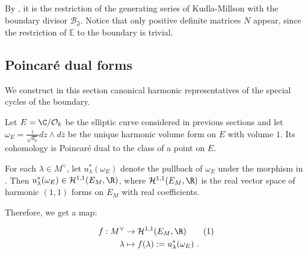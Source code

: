 \documentclass[11pt,letterpaper,english]{amsart}
\numberwithin{equation}{subsection}
\numberwithin{equation}{section}
\newcommand\numberthis{\addtocounter{equation}{1}\tag{\theequation}}
\newcommand\cB{{\mathcal B}}
\newcommand\cO{{\mathcal O}}
\newcommand\fJ{{\mathfrak J}}
\theoremstyle{plain}
\theoremstyle{remark}
\begin{document}
By , it is the restriction of the generating series of Kudla-Millson with the boundary divisor $\cB_\fJ$. Notice that only positive definite matrices $N$ appear, since the restriction of $\mathbb E$ to the boundary is trivial.



       

\subsection{Poincar\'e dual forms}

We construct in this section canonical harmonic representatives of the special cycles of the boundary. 

\medskip 

 Let $E=\C/\cO_k$ be the elliptic curve considered in previous sections and let $\omega_E=\frac{i}{\sqrt{d_k}} dz\wedge d\overline{z}$ be the unique harmonic volume form on $E$ with volume $1$. Its cohomology is Poincar\'e dual to the class of a point on $E$.
 
 For each $\lambda\in M^\vee$, let $u^*_{\lambda}(\omega_E)$ denote the pullback of $\omega_E$ under the morphism in . Then $u^*_{\lambda}(\omega_E)\in \mathcal{H}^{1,1}(E_M,\R)$, where $\mathcal{H}^{1,1}(E_M,\R)$ is the real vector space of harmonic $(1,1)$ forms on $E_M$ with real coefficients.
 
 Therefore, we get a map:
 
\begin{align*}
    f: M^\vee &\rightarrow \mathcal{H}^{1,1}(E_M,\R)\numberthis \label{map-of-lattice}\\ 
    \lambda&\mapsto f(\lambda):=u^*_{\lambda}(\omega_E)~.
\end{align*}
\end{document}
